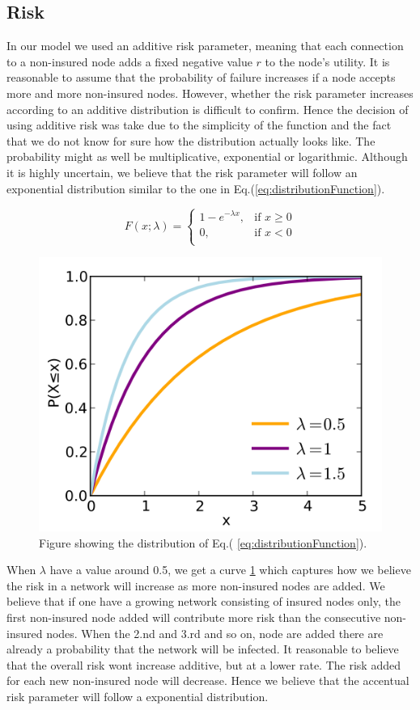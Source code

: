 \subsection{Risk}
In our model we used an additive risk parameter, meaning that each connection to a non-insured node adds a fixed negative value $r$ to the node's utility. It is reasonable to assume that the probability of failure increases if a node accepts more and more non-insured nodes. However, whether the risk parameter increases according to an additive distribution is difficult to confirm. Hence the decision of using additive risk was take due to the simplicity of the function and the fact that we do not know for sure how the distribution actually looks like. The probability might as well be multiplicative, exponential or logarithmic. Although it is highly uncertain, we believe that the risk parameter will follow an exponential distribution similar to the one in Eq.(\ref{eq:distributionFunction}).

\begin{equation}
    F(x;\lambda)= 
\begin{cases}
    1-e^{-\lambda x} ,& \text{if } x \geq 0\\
   0,& \text{if }  x<0\\
    
    
\end{cases}
\label{eq:distributionFunction}
\end{equation}



\begin{figure}[h]
\centering
  \includegraphics[width=0.5\linewidth]{../Figures/exponentialFunction.png}
  \caption{\label{fig:exponentialFunction} Figure showing the distribution of Eq.( \ref{eq:distributionFunction}). }
\end{figure}

When $\lambda$ have a value around 0.5, we get a curve \ref{fig:exponentialFunction} which captures how we believe the risk in a network will increase as more non-insured nodes are added. We believe that if one have a growing network consisting of insured nodes only, the first non-insured node added will contribute more risk than the consecutive non-insured nodes. When the 2.nd and 3.rd and so on, node are added there are already a probability that the network will be infected. It reasonable to believe that the overall risk wont increase additive, but at a lower rate. The risk added for each new non-insured node will decrease. Hence we believe that the accentual risk parameter will follow a exponential distribution. 


